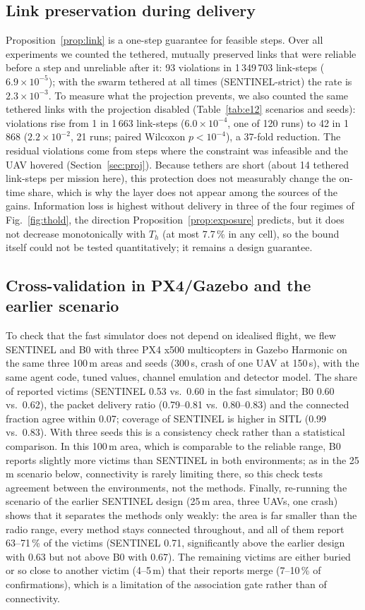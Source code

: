\subsection{Link preservation during delivery}\label{sec:eval:safety}
Proposition~\ref{prop:link} is a one-step guarantee for feasible steps. Over all experiments we
counted the tethered, mutually preserved links that were reliable before a step and unreliable after
it: 93 violations in 1\,349\,703 link-steps ($6.9\times10^{-5}$); with the swarm tethered at all times (SENTINEL-strict) the rate is $2.3\times10^{-3}$. To
measure what the projection prevents, we also counted the same tethered links with the projection
disabled (Table~\ref{tab:e12} scenarios and seeds): violations rise from 1 in 1\,663 link-steps
($6.0\times10^{-4}$, one of 120 runs) to 42 in 1\,868 ($2.2\times10^{-2}$, 21 runs; paired Wilcoxon
$p<10^{-4}$), a 37-fold reduction. The residual violations come from steps where the constraint was
infeasible and the UAV hovered (Section~\ref{sec:proj}). Because tethers are short (about 14
tethered link-steps per mission here), this protection does not measurably change the on-time share,
which is why the layer does not appear among the sources of the gains. Information loss is highest
without delivery in three of the four regimes of Fig.~\ref{fig:thold}, the direction
Proposition~\ref{prop:exposure} predicts, but it does not decrease monotonically with $T_h$ (at most
7.7\,\% in any cell), so the bound itself could not be tested quantitatively; it remains a design
guarantee.

\subsection{Cross-validation in PX4/Gazebo and the earlier scenario}\label{sec:eval:sitl}
To check that the fast simulator does not depend on idealised flight, we flew SENTINEL and B0 with
three PX4 x500 multicopters in Gazebo Harmonic on the same three 100\,m areas and seeds (300\,s,
crash of one UAV at 150\,s), with the same agent code, tuned values, channel emulation and detector
model. The share of reported victims (SENTINEL 0.53 vs.\ 0.60 in the fast simulator; B0 0.60 vs.\
0.62), the packet delivery ratio (0.79--0.81 vs.\ 0.80--0.83) and the connected fraction agree within
0.07; coverage of SENTINEL is higher in SITL (0.99 vs.\ 0.83). With three seeds this is a consistency
check rather than a statistical comparison. In this 100\,m area, which is comparable to the reliable
range, B0 reports slightly more victims than SENTINEL in both environments; as in the 25\,m scenario
below, connectivity is rarely limiting there, so this check tests agreement between the
environments, not the methods. Finally, re-running the scenario of the earlier SENTINEL design
(25\,m area, three UAVs, one crash) shows that it separates the methods only weakly: the
area is far smaller than the radio range, every method stays connected throughout, and all of them
report 63--71\,\% of the victims (SENTINEL 0.71, significantly above the earlier design with 0.63
but not above B0 with 0.67). The remaining victims are either buried or so close to
another victim (4--5\,m) that their reports merge (7--10\,\% of confirmations), which is a
limitation of the association gate rather than of connectivity.
